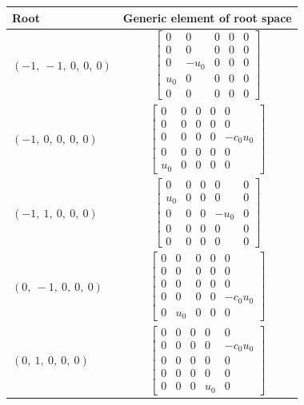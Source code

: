 \documentclass[11pt]{article}
\theoremstyle{definition}
\begin{document}
\bigskip

\noindent \begin{longtable}{|l|c|}
    \hline
    \textbf{Root} & \textbf{Generic element of root space} \\
    \hline
    \endhead
    $\left( -1, \  -1, \  0, \  0, \  0\right)$ & ${\left[\begin{matrix}0 & 0 & 0 & 0 & 0\\0 & 0 & 0 & 0 & 0\\0 & - u_{0} & 0 & 0 & 0\\u_{0} & 0 & 0 & 0 & 0\\0 & 0 & 0 & 0 & 0\end{matrix}\right]}$ \\
    \hline
    $\left( -1, \  0, \  0, \  0, \  0\right)$ & ${\left[\begin{matrix}0 & 0 & 0 & 0 & 0\\0 & 0 & 0 & 0 & 0\\0 & 0 & 0 & 0 & - c_{0} u_{0}\\0 & 0 & 0 & 0 & 0\\u_{0} & 0 & 0 & 0 & 0\end{matrix}\right]}$ \\
    \hline
    $\left( -1, \  1, \  0, \  0, \  0\right)$ & ${\left[\begin{matrix}0 & 0 & 0 & 0 & 0\\u_{0} & 0 & 0 & 0 & 0\\0 & 0 & 0 & - u_{0} & 0\\0 & 0 & 0 & 0 & 0\\0 & 0 & 0 & 0 & 0\end{matrix}\right]}$ \\
    \hline
    $\left( 0, \  -1, \  0, \  0, \  0\right)$ & ${\left[\begin{matrix}0 & 0 & 0 & 0 & 0\\0 & 0 & 0 & 0 & 0\\0 & 0 & 0 & 0 & 0\\0 & 0 & 0 & 0 & - c_{0} u_{0}\\0 & u_{0} & 0 & 0 & 0\end{matrix}\right]}$ \\
    \hline
    $\left( 0, \  1, \  0, \  0, \  0\right)$ & ${\left[\begin{matrix}0 & 0 & 0 & 0 & 0\\0 & 0 & 0 & 0 & - c_{0} u_{0}\\0 & 0 & 0 & 0 & 0\\0 & 0 & 0 & 0 & 0\\0 & 0 & 0 & u_{0} & 0\end{matrix}\right]}$ \\

\end{longtable}
\end{document}
